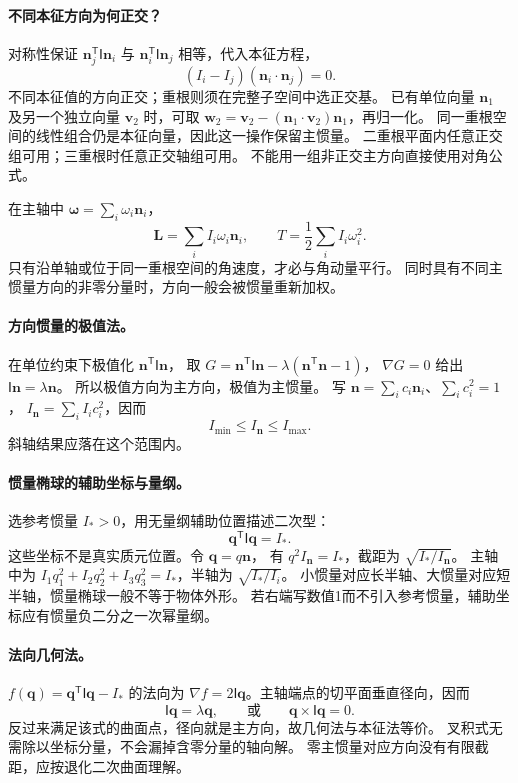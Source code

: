 \documentclass[UTF8,zihao=-4,fontset=fandol,a4paper]{ctexart}
\newcommand{\vect}[1]{\bm{#1}}
\begin{document}
\paragraph{不同本征方向为何正交？}
对称性保证 $\vect n_j^{\mathsf T}\mathsf I\vect n_i$
与 $\vect n_i^{\mathsf T}\mathsf I\vect n_j$ 相等，代入本征方程，
\[
(I_i-I_j)(\vect n_i\cdot\vect n_j)=0.
\]
不同本征值的方向正交；重根则须在完整子空间中选正交基。
已有单位向量 $\vect n_1$ 及另一个独立向量 $\vect v_2$ 时，可取
$\vect w_2=\vect v_2-(\vect n_1\cdot\vect v_2)\vect n_1$，再归一化。
同一重根空间的线性组合仍是本征向量，因此这一操作保留主惯量。
二重根平面内任意正交组可用；三重根时任意正交轴组可用。
不能用一组非正交主方向直接使用对角公式。

在主轴中 $\vect\omega=\sum_i\omega_i\vect n_i$，
\[
\vect L=\sum_iI_i\omega_i\vect n_i,
\qquad T=\frac12\sum_iI_i\omega_i^2.
\]
只有沿单轴或位于同一重根空间的角速度，才必与角动量平行。
同时具有不同主惯量方向的非零分量时，方向一般会被惯量重新加权。

\paragraph{方向惯量的极值法。}
在单位约束下极值化 $\vect n^{\mathsf T}\mathsf I\vect n$，
取 $G=\vect n^{\mathsf T}\mathsf I\vect n-\lambda(\vect n^{\mathsf T}\vect n-1)$，
$\nabla G=0$ 给出 $\mathsf I\vect n=\lambda\vect n$。
所以极值方向为主方向，极值为主惯量。
写 $\vect n=\sum_i c_i\vect n_i$、$\sum_i c_i^2=1$，
$I_{\vect n}=\sum_iI_ic_i^2$，因而
\[
I_{\min}\le I_{\vect n}\le I_{\max}.
\]
斜轴结果应落在这个范围内。

\paragraph{惯量椭球的辅助坐标与量纲。}
选参考惯量 $I_*>0$，用无量纲辅助位置描述二次型：
\[
\vect q^{\mathsf T}\mathsf I\vect q=I_*.
\]
这些坐标不是真实质元位置。令 $\vect q=q\vect n$，
有 $q^2I_{\vect n}=I_*$，截距为 $\sqrt{I_*/I_{\vect n}}$。
主轴中为 $I_1q_1^2+I_2q_2^2+I_3q_3^2=I_*$，半轴为 $\sqrt{I_*/I_i}$。
小惯量对应长半轴、大惯量对应短半轴，惯量椭球一般不等于物体外形。
若右端写数值1而不引入参考惯量，辅助坐标应有惯量负二分之一次幂量纲。

\paragraph{法向几何法。}
$f(\vect q)=\vect q^{\mathsf T}\mathsf I\vect q-I_*$ 的法向为
$\nabla f=2\mathsf I\vect q$。主轴端点的切平面垂直径向，因而
\[
\mathsf I\vect q=\lambda\vect q,
\qquad\text{或}\qquad\vect q\times\mathsf I\vect q=0.
\]
反过来满足该式的曲面点，径向就是主方向，故几何法与本征法等价。
叉积式无需除以坐标分量，不会漏掉含零分量的轴向解。
零主惯量对应方向没有有限截距，应按退化二次曲面理解。
\end{document}
